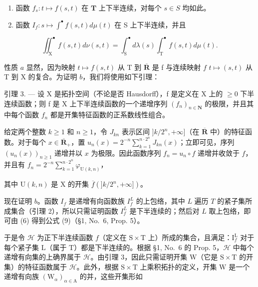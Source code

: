 \begin{enumerate}
\def\labelenumi{\alph{enumi})}
\item
  函数 \(f_{s}: t \mapsto f(s, t)\) 在 \(\mathbf{T}\) 上下半连续，对每个 \(s \in S\) 均如此。
\item
  函数 \(I_{f}: s \mapsto \int^{\bullet} f(s, t) d\mu(t)\) 在 S 上下半连续，并且
\end{enumerate}

\[
\iint_ {\mathrm{X}} ^ {\bullet} f (s, t) d \nu (s, t) = \int_ {\mathrm{S}} ^ {\bullet} d \lambda (s) \int_ {\mathrm{T}} ^ {\bullet} f (s, t) d \mu (t).\tag{9}
\]

性质 \(a\) 显然，因为映射 \(t \mapsto f(s,t)\) 从 T 到 \(\overline{\mathbf{R}}\) 是 f 与连续映射 \(f\) \(t \mapsto (s,t)\) 从 T 到 X 的复合。为证明 \(b\)，我们将使用如下引理：

引理 3. --- 设 X 是拓扑空间（不论是否 Hausdorff），f 是定义在 X 上的 \(\geqslant 0\) 下半连续函数；则 f 是 X 上下半连续函数的一个递增序列 \((f_{n})_{n\in\mathbf{N}}\) 的极限，并且其中每个函数 \(f_{n}\) 都是开集特征函数的正系数线性组合。

给定两个整数 \(k \geqslant 1\) 和 \(n \geqslant 1\)，令 \(J_{kn}\) 表示区间 \(]k/2^n, +\infty]\)（在 \(\overline{\mathbf{R}}\) 中）的特征函数。对于每个 \(x \in \overline{\mathbf{R}}_+\)，置 \(u_n(x) = 2^{-n} \sum_{k=1}^{n \cdot 2^n} J_{kn}(x)\)；立即可见，序列 \((u_n(x))_{n \geqslant 1}\) 递增并以 \(x\) 为极限。因此函数序列 \(f_n = u_n \circ f\) 递增并收敛于 \(f\)，并且有 \(f_{n} = 2^{-n}\sum_{k = 1}^{n\cdot 2^{n}}\varphi_{\mathrm{U}(k,n)}\)，

其中 \(\mathrm{U}(k,n)\) 是 X 的开集 \(\overline{f} (]k / 2^n, + \infty ])\)。

现在证明 \(b\)。函数 \(I_f\) 是递增有向函数族 \(I_f^L\) 的上包络，其中 \(L\) 遍历 \(T\) 的紧子集所成集合（引理 2），所以只需证明函数 \(I_f^L\) 是下半连续的；然后对 \(L\) 取上包络，即可由 (6) 得到公式 (9)（§1, No.~6, Prop. 5）。

于是令 \(\mathcal{H}\) 为正下半连续函数 \(f\)（定义在 \(\mathrm{S} \times \mathrm{T}\) 上）所成的集合，且满足：\(\mathrm{I}_f^{\mathrm{L}}\) 对于每个紧子集 \(\mathrm{L}\)（属于 \(\mathrm{T}\)）都是下半连续的。根据 §1, No.~6 的 Prop. 5，\(\mathcal{H}\) 中每个递增有向集的上确界属于 \(\mathcal{H}\)。由引理 3，因此只需证明开集 \(\mathrm{W}\)（它是 \(\mathrm{S} \times \mathrm{T}\) 的开集）的特征函数属于 \(\mathcal{H}\)。此外，根据 \(\mathrm{S} \times \mathrm{T}\) 上乘积拓扑的定义，开集 \(\mathrm{W}\) 是一个递增有向族 \((\mathrm{W}_{\alpha})_{\alpha \in \mathrm{A}}\) 的并，这些开集形如

